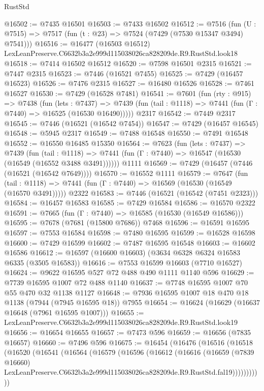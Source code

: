 \begin{lexlean}{RustStd}
\begin{coremodule}
@16502 := @7435 @16501
@16503 := @7433 @16502
@16512 := @7516
    (fun (U : @7515) => @7517 (fun (t : @23) => @7524 (@7429 (@7530 @15347 @3494) @7541)))
@16516 := @16477 (@16503 @16512) LexLeanPreserve.C6632b3a2e999d115038026ca828209de.R9.RustStd.look18
@16518 := @7414 @16502 @16512
@16520 := @7598 @16501 @2315
@16521 := @7447 @2315
@16523 := @7446 (@16521 @7455)
@16525 := @7429 (@16457 @16523)
@16526 := @7476 @2315
@16527 := @16480 @16526
@16528 := @7461 @16527
@16530 := @7429 (@16528 @7481)
@16541 := @7601
    (fun (rty : @915) =>
    @7438
      (fun (lets : @7437) =>
      @7439 (fun (tail : @1118) => @7441 (fun (Γ : @7440) => @16525 (@16530 @16490)))))
    @2317
@16542 := @7449 @2317
@16545 := @7446 (@16521 (@16542 @7454))
@16547 := @7429 (@16457 @16545)
@16548 := @5945 @2317
@16549 := @7488 @16548
@16550 := @7491 @16548
@16552 := @16550 @16485 @15350
@16564 := @7623
    (fun (lets : @7437) =>
    @7439
      (fun (tail : @1118) =>
      @7441 (fun (Γ : @7440) => @16547 (@16530 (@16549 (@16552 @3488 @3491))))))
    @1111
@16569 := @7429 (@16457 (@7446 (@16521 (@16542 @7649))))
@16570 := @16552 @1111
@16579 := @7647
    (fun (tail : @1118) => @7441 (fun (Γ : @7440) => @16569 (@16530 (@16549 (@16570 @3491)))))
    @2322
@16583 := @7446 (@16521 (@16542 (@7451 @2323)))
@16584 := @16457 @16583
@16585 := @7429 @16584
@16586 := @16570 @2322
@16591 := @7665 (fun (Γ : @7440) => @16585 (@16530 (@16549 @16586)))
@16595 := @7678 (@7681 (@15800 @7686)) @7468
@16596 := @16591 @16595
@16597 := @7553 @16584
@16598 := @7480 @16595
@16599 := @16528 @16598
@16600 := @7429 @16599
@16602 := @7487 @16595 @16548
@16603 := @16602 @16586
@16612 := @16597 (@16600 @16603) (@3634 @6328 @6324 @16583 @6335 (@3505 @16583))
@16616 := @7553 @16599 @16603 (@7710 @16527)
@16624 := @9622 @16595 @527 @72 @488 @490 @1111 @1140 @596
@16629 := @7739 @16595 @1007 @72 @488 @1140
@16637 := @7748 @16595 @1007 @70 @55 @470 @32 @1138 @1127
@16648 := @7936 @16595 @1007 @18 @470 @18 @1138 (@7944 (@7945 @16595 @18)) @7955
@16654 := @16624 (@16629 (@16637 @16648 (@7961 @16595 @1007)))
@16655 := LexLeanPreserve.C6632b3a2e999d115038026ca828209de.R9.RustStd.look19
@16656 := @16654 @16655
@16657 := @7473 @596
@16659 := @16656 (@7835 @16657)
@16660 := @7496 @596
@16675 := @16454
    (@16476
      (@16516
        (@16518
          (@16520
            (@16541
              (@16564
                (@16579
                  (@16596
                    (@16612
                      (@16616
                        (@16659
                          (@7839 @16660)
                          LexLeanPreserve.C6632b3a2e999d115038026ca828209de.R9.RustStd.fal19)))))))))))

\end{coremodule}
\end{lexlean}
